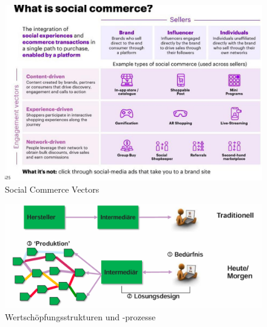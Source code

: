 \documentclass[../Main.tex]{subfiles}
\begin{document}
\begin{figure}[H]
    \centering
    \includegraphics[width=1\linewidth]{Images/digbus/socialcommvec.png}
    \caption{Social Commerce Vectors}
\end{figure}


\begin{figure}[H]
    \centering
    \includegraphics[width=1\linewidth]{Images/digbus/wertschzsm.png}
    \caption{Wertschöpfungsstrukturen und -prozesse}
\end{figure}
\end{document}
